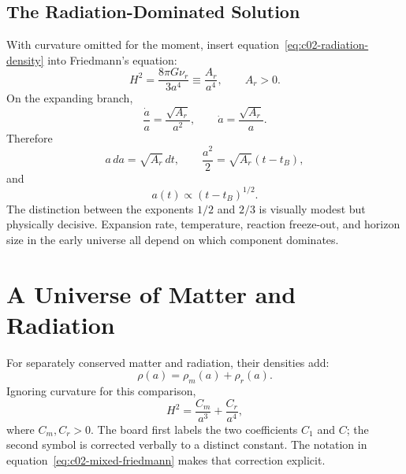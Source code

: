 \begin{classroomqa}
\end{classroomqa}

\subsection{The Radiation-Dominated Solution}

With curvature omitted for the moment, insert equation~\eqref{eq:c02-radiation-density} into Friedmann's equation:
\begin{equation}
H^2=\frac{8\pi G\nu_r}{3a^4}
\equiv\frac{A_r}{a^4},
\qquad A_r>0.
\label{eq:c02-radiation-friedmann}
\end{equation}
On the expanding branch,
\begin{equation}
\frac{\dot a}{a}=\frac{\sqrt{A_r}}{a^2},
\qquad
\dot a=\frac{\sqrt{A_r}}{a}.
\end{equation}
Therefore
\begin{equation}
a\,da=\sqrt{A_r}\,dt,
\qquad
\frac{a^2}{2}=\sqrt{A_r}(t-t_B),
\end{equation}
and
\begin{equation}
\boxed{a(t)\propto(t-t_B)^{1/2}.}
\label{eq:c02-radiation-law}
\end{equation}
The distinction between the exponents \(1/2\) and \(2/3\) is visually modest but physically decisive. Expansion rate, temperature, reaction freeze-out, and horizon size in the early universe all depend on which component dominates.

\section{A Universe of Matter and Radiation}

For separately conserved matter and radiation, their densities add:
\begin{equation}
\rho(a)=\rho_m(a)+\rho_r(a).
\end{equation}
Ignoring curvature for this comparison,
\begin{equation}
\boxed{H^2=\frac{C_m}{a^3}+\frac{C_r}{a^4},}
\label{eq:c02-mixed-friedmann}
\end{equation}
where \(C_m,C_r>0\). The board first labels the two coefficients \(C_1\) and \(C\); the second symbol is corrected verbally to a distinct constant. The notation in equation~\eqref{eq:c02-mixed-friedmann} makes that correction explicit.

